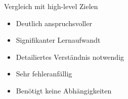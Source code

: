 \begin{frame}{Vergleich mit high-level Zielen}
	\begin{itemize}
		\item Deutlich anspruchsvoller
		\item Signifikanter Lernaufwandt
		\item Detailiertes Verständnis notwendig
		\item Sehr fehleranfällig
		\item Benötigt keine Abhängigkeiten
	\end{itemize}
\end{frame}
